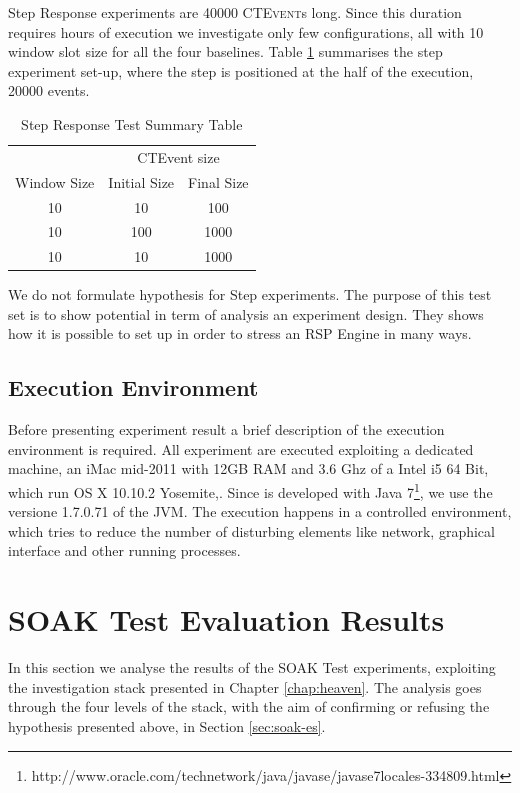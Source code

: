 Step Response experiments are 40000 \textsc{CTEvent}s long. Since this duration requires hours of execution we investigate only few configurations, all with 10 window slot size for all the four baselines. Table \ref{tab:steptests} summarises the step experiment set-up, where the step is positioned at the half of the execution, 20000 events.
\begin{table}[htb]
\centering
 \begin{tabular}{c|c|c}
	  	\hline
	  	&\multicolumn{2}{c}{CTEvent size}  \\
		Window Size & Initial Size & Final Size\\
		\hline
		\hline
		 10 & 10 & 100\\
		  10 & 100 & 1000\\
		 10 & 10 & 1000\\
		\hline 
 \end{tabular}
 \caption[Step Response Tests Summary Table]{Step Response Test Summary Table}
\label{tab:steptests}
\end{table}

We do not formulate hypothesis for Step experiments. The purpose of this test set is to show \name potential in term of analysis an experiment design. They shows how it is possible to set up \name in order to stress an RSP Engine in many ways.

\subsection{Execution Environment}\label{sec:execution-environment}

Before presenting experiment result a brief description of the execution environment is required. All experiment are executed exploiting a dedicated machine, an iMac mid-2011 with 12GB RAM and 3.6 Ghz of a Intel i5 64 Bit, which run OS X 10.10.2 Yosemite,. Since \name is developed with Java 7\footnote{http://www.oracle.com/technetwork/java/javase/javase7locales-334809.html}, we use the versione 1.7.0.71 of the JVM.
The execution happens in a controlled environment, which tries to reduce the number of disturbing elements like network, graphical interface and other running processes.

\section{SOAK Test Evaluation Results}\label{sec:soakres}

In this section we analyse the results of the SOAK Test experiments, exploiting the investigation stack presented in Chapter \ref{chap:heaven}. The analysis goes through the four levels of the stack, with the aim of confirming or refusing the hypothesis presented above, in Section \ref{sec:soak-es}. 

